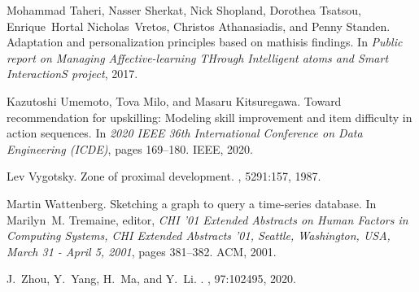 \documentclass[11pt]{article}
\begin{document}
\begin{thebibliography}{10}
\begin{small}
Mohammad Taheri, Nasser Sherkat, Nick Shopland, Dorothea Tsatsou,
  Enrique~Hortal Nicholas~Vretos, Christos Athanasiadis, and Penny Standen.
\newblock Adaptation and personalization principles based on mathisis findings.
\newblock In {\em Public report on Managing Affective-learning THrough
  Intelligent atoms and Smart InteractionS project}, 2017.

Kazutoshi Umemoto, Tova Milo, and Masaru Kitsuregawa.
\newblock Toward recommendation for upskilling: Modeling skill improvement and
  item difficulty in action sequences.
\newblock In {\em 2020 IEEE 36th International Conference on Data Engineering
  (ICDE)}, pages 169--180. IEEE, 2020.

Lev Vygotsky.
\newblock Zone of proximal development.
, 5291:157, 1987.

Martin Wattenberg.
\newblock Sketching a graph to query a time-series database.
\newblock In Marilyn~M. Tremaine, editor, {\em {CHI} '01 Extended Abstracts on
  Human Factors in Computing Systems, {CHI} Extended Abstracts '01, Seattle,
  Washington, USA, March 31 - April 5, 2001}, pages 381--382. {ACM}, 2001.
  
  
J.~Zhou, Y.~Yang, H.~Ma, and Y.~Li.
.
, 97:102495, 2020.


\end{small}
\end{thebibliography}
\end{document}
